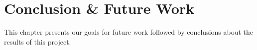 \chapter{Conclusion \& Future Work}\label{ch:conclusion}
This chapter presents our goals for future work followed by conclusions about the results of this project.


